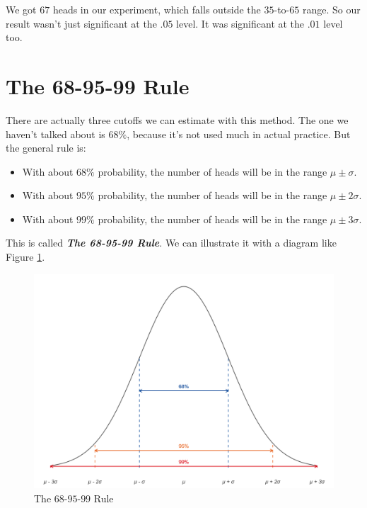\documentclass[justified]{tufte-book}
\providecommand{\tightlist}{%
  \setlength{\itemsep}{0pt}\setlength{\parskip}{0pt}}
\theoremstyle{definition}
\theoremstyle{definition}
\theoremstyle{definition}
\theoremstyle{definition}
\theoremstyle{remark}
\begin{document}
We got \(67\) heads in our experiment, which falls outside the \(35\)-to-\(65\) range. So our result wasn't just significant at the \(.05\) level. It was significant at the \(.01\) level too.

\hypertarget{the-68-95-99-rule}{%
\section{The 68-95-99 Rule}\label{the-68-95-99-rule}}

There are actually three cutoffs we can estimate with this method. The one we haven't talked about is \(68\%\), because it's not used much in actual practice. But the general rule is:

\begin{itemize}
\tightlist
\item
  With about \(68\%\) probability, the number of heads will be in the range \(\mu \pm \sigma\).
\item
  With about \(95\%\) probability, the number of heads will be in the range \(\mu \pm 2\sigma\).
\item
  With about \(99\%\) probability, the number of heads will be in the range \(\mu \pm 3\sigma\).
\end{itemize}

This is called \textbf{\emph{The 68-95-99 Rule}}. We can illustrate it with a diagram like Figure \ref{fig:snnrule}.

\begin{figure}
\includegraphics{_main_files/figure-latex/snnrule-1} \caption[The $68$-$95$-$99$ Rule]{The $68$-$95$-$99$ Rule}\label{fig:snnrule}
\end{figure}
\end{document}
